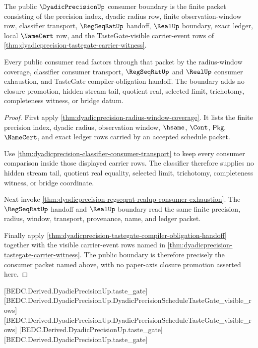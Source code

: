 \begin{theorem}
\label{thm:dyadicprecision-public-consumer-boundary}
The public $\DyadicPrecisionUp$ consumer boundary is the finite packet consisting
of the precision index, dyadic radius row, finite observation-window row,
classifier transport, $\RegSeqRatUp$ handoff, $\RealUp$ boundary, exact ledger,
local $\NameCert$ row, and the TasteGate-visible carrier-event rows of
\autoref{thm:dyadicprecision-tastegate-carrier-witness}.

Every public consumer read factors through that packet by the radius-window
coverage, classifier consumer transport, $\RegSeqRatUp$ and $\RealUp$ consumer
exhaustion, and TasteGate compiler-obligation handoff. The boundary adds no
closure promotion, hidden stream tail, quotient real, selected limit,
trichotomy, completeness witness, or bridge datum.
\end{theorem}
\begin{proof}
First apply \autoref{thm:dyadicprecision-radius-window-coverage}. It lists the
finite precision index, dyadic radius, observation window, $\hsame$, $\Cont$,
$\mathsf{Pkg}$, $\NameCert$, and exact ledger rows carried by an accepted
schedule packet.

Use \autoref{thm:dyadicprecision-classifier-consumer-transport} to keep every
consumer comparison inside those displayed carrier rows. The classifier
therefore supplies no hidden stream tail, quotient real equality, selected
limit, trichotomy, completeness witness, or bridge coordinate.

Next invoke
\autoref{thm:dyadicprecision-regseqrat-realup-consumer-exhaustion}. The
$\RegSeqRatUp$ handoff and $\RealUp$ boundary read the same finite precision,
radius, window, transport, provenance, name, and ledger packet.

Finally apply
\autoref{thm:dyadicprecision-tastegate-compiler-obligation-handoff} together
with the visible carrier-event rows named in
\autoref{thm:dyadicprecision-tastegate-carrier-witness}. The public boundary is
therefore precisely the consumer packet named above, with no paper-axis closure
promotion asserted here.
\end{proof}

[BEDC.Derived.DyadicPrecisionUp.taste\_gate]
[BEDC.Derived.DyadicPrecisionUp.DyadicPrecisionScheduleTasteGate\_visible\_rows]
[BEDC.Derived.DyadicPrecisionUp.DyadicPrecisionScheduleTasteGate\_visible\_rows]
[BEDC.Derived.DyadicPrecisionUp.taste\_gate]
[BEDC.Derived.DyadicPrecisionUp.taste\_gate]

